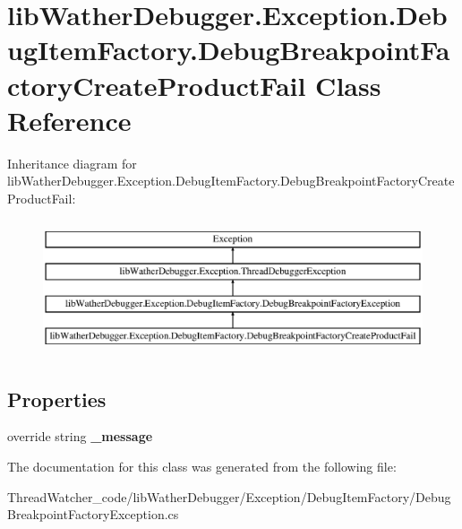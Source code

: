 \hypertarget{classlib_wather_debugger_1_1_exception_1_1_debug_item_factory_1_1_debug_breakpoint_factory_create_product_fail}{\section{lib\+Wather\+Debugger.\+Exception.\+Debug\+Item\+Factory.\+Debug\+Breakpoint\+Factory\+Create\+Product\+Fail Class Reference}
\label{classlib_wather_debugger_1_1_exception_1_1_debug_item_factory_1_1_debug_breakpoint_factory_create_product_fail}
}
Inheritance diagram for lib\+Wather\+Debugger.\+Exception.\+Debug\+Item\+Factory.\+Debug\+Breakpoint\+Factory\+Create\+Product\+Fail\+:\begin{figure}[H]
\begin{center}
\leavevmode
\includegraphics[height=4.000000cm]{classlib_wather_debugger_1_1_exception_1_1_debug_item_factory_1_1_debug_breakpoint_factory_create_product_fail}
\end{center}
\end{figure}
\subsection*{Properties}
\begin{DoxyCompactItemize}
\item 
\hypertarget{classlib_wather_debugger_1_1_exception_1_1_debug_item_factory_1_1_debug_breakpoint_factory_create_product_fail_a19c5135aad1da9e9e630786e555e71fa}{override string {\bfseries \+\_\+message}}\label{classlib_wather_debugger_1_1_exception_1_1_debug_item_factory_1_1_debug_breakpoint_factory_create_product_fail_a19c5135aad1da9e9e630786e555e71fa}

\end{DoxyCompactItemize}


The documentation for this class was generated from the following file\+:\begin{DoxyCompactItemize}
\item 
Thread\+Watcher\+\_\+code/lib\+Wather\+Debugger/\+Exception/\+Debug\+Item\+Factory/Debug\+Breakpoint\+Factory\+Exception.\+cs\end{DoxyCompactItemize}
